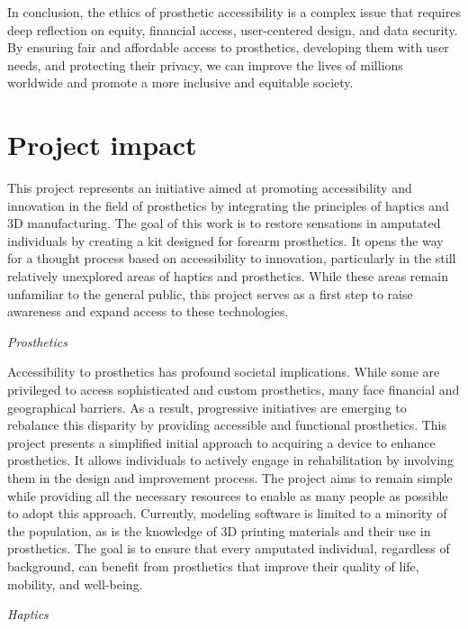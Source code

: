 In conclusion, the ethics of prosthetic accessibility is a complex issue that requires deep reflection on equity, financial access, user-centered design, and data security. By ensuring fair and affordable access to prosthetics, developing them with user needs, and protecting their privacy, we can improve the lives of millions worldwide and promote a more inclusive and equitable society.

\section{Project impact}
This project represents an initiative aimed at promoting accessibility and innovation in the field of prosthetics by integrating the principles of haptics and 3D manufacturing. The goal of this work is to restore sensations in amputated individuals by creating a kit designed for forearm prosthetics. It opens the way for a thought process based on accessibility to innovation, particularly in the still relatively unexplored areas of haptics and prosthetics. While these areas remain unfamiliar to the general public, this project serves as a first step to raise awareness and expand access to these technologies.

\textit{Prosthetics}

Accessibility to prosthetics has profound societal implications. While some are privileged to access sophisticated and custom prosthetics, many face financial and geographical barriers. As a result, progressive initiatives are emerging to rebalance this disparity by providing accessible and functional prosthetics. This project presents a simplified initial approach to acquiring a device to enhance prosthetics. It allows individuals to actively engage in rehabilitation by involving them in the design and improvement process. The project aims to remain simple while providing all the necessary resources to enable as many people as possible to adopt this approach. Currently, modeling software is limited to a minority of the population, as is the knowledge of 3D printing materials and their use in prosthetics. The goal is to ensure that every amputated individual, regardless of background, can benefit from prosthetics that improve their quality of life, mobility, and well-being.

\textit{Haptics}

